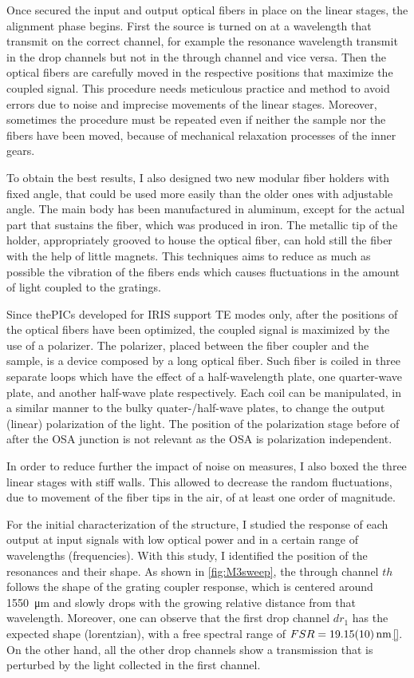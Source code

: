 Once secured the input and output optical fibers in place on the linear stages, the alignment phase begins.
First the source is turned on at a wavelength that transmit on the correct channel, for example the resonance wavelength transmit in the drop channels but not in the through channel and vice versa.
Then the optical fibers are carefully moved in the respective positions that maximize the coupled signal.
This procedure needs meticulous practice and method to avoid errors due to noise and imprecise movements of the linear stages.
Moreover, sometimes the procedure must be repeated even if neither the sample nor the fibers have been moved, because of mechanical relaxation processes of the inner gears.

To obtain the best results, I also designed two new modular fiber holders with fixed angle, that could be used more easily than the older ones with adjustable angle.
The main body has been manufactured in aluminum, except for the actual part that sustains the fiber, which was produced in iron.
The metallic tip of the holder, appropriately grooved to house the optical fiber, can hold still the fiber with the help of little magnets.
This techniques aims to reduce as much as possible the vibration of the fibers ends which causes fluctuations in the amount of light coupled to the gratings.

Since the\acp{PIC} developed for IRIS support \acs{TE} modes only, after the positions of the optical fibers have been optimized, the coupled signal is maximized by the use of a polarizer.
The polarizer, placed between the fiber coupler and the sample, is a device composed by a long optical fiber.
Such fiber is coiled in three separate loops which have the effect of a half-wavelength plate, one quarter-wave plate, and another half-wave plate respectively.
Each coil can be manipulated, in a similar manner to the bulky quater-/half-wave plates, to change the output (linear) polarization of the light.
The position of the polarization stage before of after the \ac{OSA} junction is not relevant as the \ac{OSA} is polarization independent.

In order to reduce further the impact of noise on measures, I also boxed the three linear stages with stiff walls.
This allowed to decrease the random fluctuations, due to movement of the fiber tips in the air, of at least one order of magnitude.

For the initial characterization of the structure, I studied the response of each output at input signals with low optical power and in a certain range of wavelengths (frequencies).
With this study, I identified the position of the resonances and their shape.
As shown in \autoref{fig:M3sweep}, the through channel $th$ follows the shape of the grating coupler response, which is centered around \SI{1550}{\um} and slowly drops with the growing relative distance from that wavelength.
Moreover, one can observe that the first drop channel $dr_1$ has the expected shape (lorentzian), with a free spectral range of $FSR=\SI{19.15+-.1}{\nm}$\ref{}.
On the other hand, all the other drop channels show a transmission that is perturbed by the light collected in the first channel.

